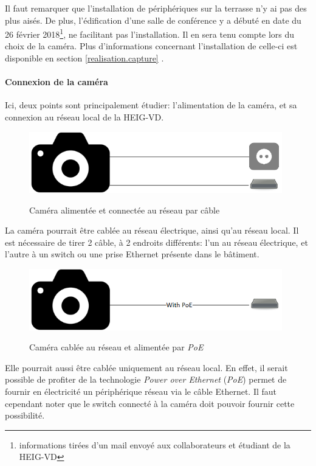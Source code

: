 Il faut remarquer que l'installation de périphériques sur la terrasse n'y ai pas des plus aisés. De plus, l'édification d'une salle de conférence y a débuté en date du 26 février 2018\footnote{informations tirées d'un mail envoyé aux collaborateurs et étudiant de la HEIG-VD}, ne facilitant pas l'installation. Il en sera tenu compte lors du choix de la caméra. Plus d'informations concernant l'installation de celle-ci est disponible en section \ref{realisation.capture} .

\paragraph{Connexion de la caméra}

Ici, deux points sont principalement étudier: l'alimentation de la caméra, et sa connexion au réseau local de la HEIG-VD.  

\begin{figure}[H]
    \includegraphics[width=110mm]{img/conception/cam_con_1.png}
    \label{fig:cam_connection_1}
    \centering
    \caption{Caméra alimentée et connectée au réseau par câble}
\end{figure}

La caméra pourrait être cablée au réseau électrique, ainsi qu'au réseau local. Il est nécessaire de tirer 2 câble, à 2 endroits différents: l'un au réseau électrique, et l'autre à un switch ou une prise Ethernet présente dans le bâtiment.

\begin{figure}[H]
    \includegraphics[width=110mm]{img/conception/cam_con_2.png}
    \label{fig:cam_connection_2}
    \centering
    \caption{Caméra cablée au réseau et alimentée par \textit{PoE}}
\end{figure}

Elle pourrait aussi être cablée uniquement au réseau local. En effet, il serait possible de profiter de la technologie \textit{Power over Ethernet} (\textit{PoE}) permet de fournir en électricité un périphérique réseau via le câble Ethernet. Il faut cependant noter que le switch connecté à la caméra doit pouvoir fournir cette possibilité.

